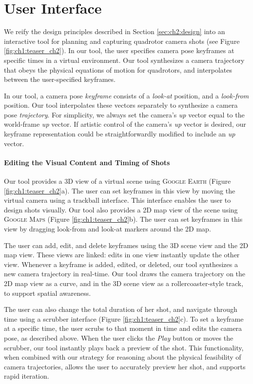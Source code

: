 \section{User Interface}
\label{sec:ch2:ui}

We reify the design principles described in Section \ref{sec:ch2:design} into an interactive tool for planning and capturing quadrotor camera shots (see Figure \ref{fig:ch1:teaser_ch2}).
In our tool, the user specifies camera pose keyframes at specific times in a virtual environment.
Our tool synthesizes a camera trajectory that obeys the physical equations of motion for quadrotors, and interpolates between the user-specified keyframes.

In our tool, a camera pose \emph{keyframe} consists of a \emph{look-at} position, and a \emph{look-from} position.
Our tool interpolates these vectors separately to synthesize a camera pose \emph{trajectory}.
For simplicity, we always set the camera's \emph{up} vector equal to the world-frame \emph{up} vector.
If artistic control of the camera's \emph{up} vector is desired, our keyframe representation could be straightforwardly modified to include an \emph{up} vector. 

\paragraph{Editing the Visual Content and Timing of Shots}

Our tool provides a 3D view of a virtual scene using \textsc{Google Earth} (Figure \ref{fig:ch1:teaser_ch2}a).
The user can set keyframes in this view by moving the virtual camera using a trackball interface.
This interface enables the user to design shots visually.
Our tool also provides a 2D map view of the scene using \textsc{Google Maps} (Figure \ref{fig:ch1:teaser_ch2}b).
The user can set keyframes in this view by dragging look-from and look-at markers around the 2D map.

The user can add, edit, and delete keyframes using the 3D scene view and the 2D map view.
These views are linked: edits in one view instantly update the other view.
Whenever a keyframe is added, edited, or deleted, our tool synthesizes a new camera trajectory in real-time.
Our tool draws the camera trajectory on the 2D map view as a curve, and in the 3D scene view as a rollercoaster-style track, to support spatial awareness.

The user can also change the total duration of her shot, and navigate through time using a scrubber interface (Figure \ref{fig:ch1:teaser_ch2}c). To set a keyframe at a specific time, the user scrubs to that moment in time and edits the camera pose, as described above.
When the user clicks the \emph{Play} button or moves the scrubber, our tool instantly plays back a preview of the shot.
This functionality, when combined with our strategy for reasoning about the physical feasibility of camera trajectories, allows the user to accurately preview her shot, and supports rapid iteration.


